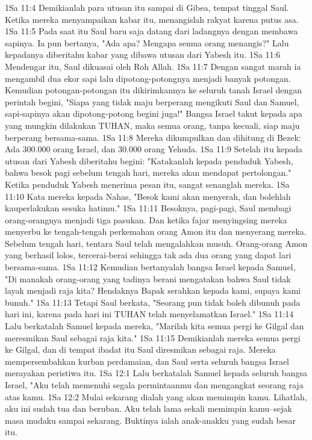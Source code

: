 1Sa 11:4  Demikianlah para utusan itu sampai di Gibea, tempat tinggal Saul. Ketika mereka menyampaikan kabar itu, menangislah rakyat karena putus asa.
1Sa 11:5  Pada saat itu Saul baru saja datang dari ladangnya dengan membawa sapinya. Ia pun bertanya, "Ada apa? Mengapa semua orang menangis?" Lalu kepadanya diberitahu kabar yang dibawa utusan dari Yabesh itu.
1Sa 11:6  Mendengar itu, Saul dikuasai oleh Roh Allah.
1Sa 11:7  Dengan sangat marah ia mengambil dua ekor sapi lalu dipotong-potongnya menjadi banyak potongan. Kemudian potongan-potongan itu dikirimkannya ke seluruh tanah Israel dengan perintah begini, "Siapa yang tidak maju berperang mengikuti Saul dan Samuel, sapi-sapinya akan dipotong-potong begini juga!" Bangsa Israel takut kepada apa yang mungkin dilakukan TUHAN, maka semua orang, tanpa kecuali, siap maju berperang bersama-sama.
1Sa 11:8  Mereka dikumpulkan dan dihitung di Bezek: Ada 300.000 orang Israel, dan 30.000 orang Yehuda.
1Sa 11:9  Setelah itu kepada utusan dari Yabesh diberitahu begini: "Katakanlah kepada penduduk Yabesh, bahwa besok pagi sebelum tengah hari, mereka akan mendapat pertolongan." Ketika penduduk Yabesh menerima pesan itu, sangat senanglah mereka.
1Sa 11:10  Kata mereka kepada Nahas, "Besok kami akan menyerah, dan bolehlah kauperlakukan sesuka hatimu."
1Sa 11:11  Besoknya, pagi-pagi, Saul membagi orang-orangnya menjadi tiga pasukan. Dan ketika fajar menyingsing mereka menyerbu ke tengah-tengah perkemahan orang Amon itu dan menyerang mereka. Sebelum tengah hari, tentara Saul telah mengalahkan musuh. Orang-orang Amon yang berhasil lolos, tercerai-berai sehingga tak ada dua orang yang dapat lari bersama-sama.
1Sa 11:12  Kemudian bertanyalah bangsa Israel kepada Samuel, "Di manakah orang-orang yang tadinya berani mengatakan bahwa Saul tidak layak menjadi raja kita? Hendaknya Bapak serahkan kepada kami, supaya kami bunuh."
1Sa 11:13  Tetapi Saul berkata, "Seorang pun tidak boleh dibunuh pada hari ini, karena pada hari ini TUHAN telah menyelamatkan Israel."
1Sa 11:14  Lalu berkatalah Samuel kepada mereka, "Marilah kita semua pergi ke Gilgal dan meresmikan Saul sebagai raja kita."
1Sa 11:15  Demikianlah mereka semua pergi ke Gilgal, dan di tempat ibadat itu Saul diresmikan sebagai raja. Mereka mempersembahkan kurban perdamaian, dan Saul serta seluruh bangsa Israel merayakan peristiwa itu.
1Sa 12:1  Lalu berkatalah Samuel kepada seluruh bangsa Israel, "Aku telah memenuhi segala permintaanmu dan mengangkat seorang raja atas kamu.
1Sa 12:2  Mulai sekarang dialah yang akan memimpin kamu. Lihatlah, aku ini sudah tua dan beruban. Aku telah lama sekali memimpin kamu--sejak masa mudaku sampai sekarang. Buktinya ialah anak-anakku yang sudah besar itu.
